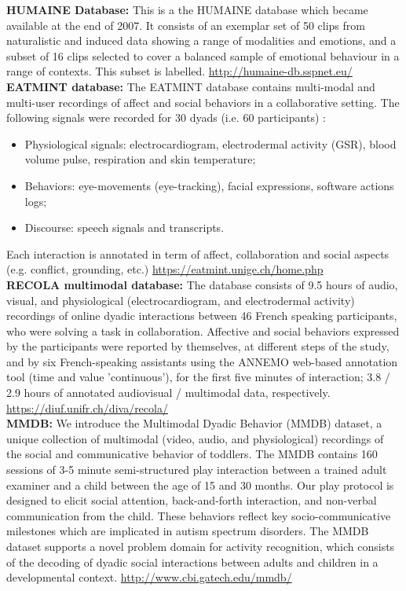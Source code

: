 \textbf{HUMAINE Database:} 
This is a the HUMAINE database which became available at the end of 2007. It consists of an exemplar set of 50 clips from naturalistic and induced data showing a range of modalities and emotions, and a subset of 16 clips selected to cover a balanced sample of emotional behaviour in a range of contexts. This subset is labelled. \url{http://humaine-db.sspnet.eu/}\\

\textbf{EATMINT database: }
The EATMINT database contains multi-modal and multi-user recordings of affect and social behaviors in a collaborative setting. The following signals were recorded for 30 dyads (i.e. 60 participants) :
\begin{itemize}
\item Physiological signals: electrocardiogram, electrodermal activity (GSR), blood volume pulse, respiration and skin temperature;
\item Behaviors: eye-movements (eye-tracking), facial expressions, software actions logs;
\item Discourse: speech signals and transcripts.
\end{itemize}
Each interaction is annotated in term of affect, collaboration and social aspects (e.g. conflict, grounding, etc.) \url{https://eatmint.unige.ch/home.php}\\

\textbf{RECOLA multimodal database:} The database consists of 9.5 hours of audio, visual, and physiological (electrocardiogram, and electrodermal activity) recordings of online dyadic interactions between 46 French speaking participants, who were solving a task in collaboration. Affective and social behaviors expressed by the participants were reported by themselves, at different steps of the study, and by six French-speaking assistants using the ANNEMO web-based annotation tool (time and value 'continuous'), for the first five minutes of interaction; 3.8 / 2.9 hours of annotated audiovisual / multimodal data, respectively. \url{https://diuf.unifr.ch/diva/recola/}\\

\textbf{MMDB:} We introduce the Multimodal Dyadic Behavior (MMDB) dataset, a unique collection of multimodal (video, audio, and physiological) recordings of the social and communicative behavior of toddlers. The MMDB contains 160 sessions of 3-5 minute semi-structured play interaction between a trained adult examiner and a child between the age of 15 and 30 months. Our play protocol is designed to elicit social attention, back-and-forth interaction, and non-verbal communication from the child. These behaviors reflect key socio-communicative milestones which are implicated in autism spectrum disorders. The MMDB dataset supports a novel problem domain for activity recognition, which consists of the decoding of dyadic social interactions between adults and children in a developmental context. \url{http://www.cbi.gatech.edu/mmdb/}


